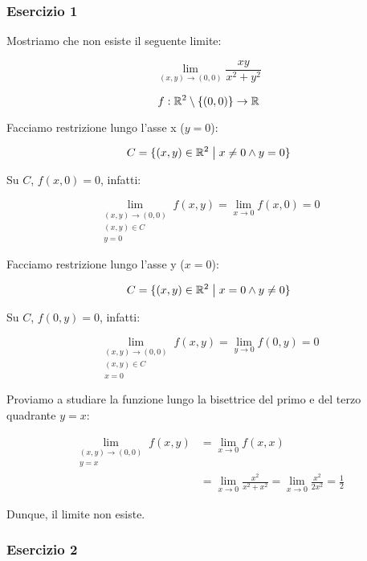 \filbreak{}
\subsubsection*{Esercizio 1}

Mostriamo che non esiste il seguente limite:

\[
    \lim_{ (x,y) \to (0,0) } \frac{xy}{x^{2}+y^{2}}
\]

\[
    f: \mathbb{R}^2 \setminus \{(0,0)\} \to \mathbb{R}
\]

Facciamo restrizione lungo l'asse x (\(y=0\)):

\[
    C = \{(x,y) \in \mathbb{R}^2 \;\big|\; x \neq 0 \land y = 0\}
\]

Su \(C\), \(f(x,0) = 0\), infatti:

\[
    \lim_{\begin{smallmatrix} (x,y) \to (0,0) \\ (x,y) \in C \\ y=0 \end{smallmatrix}} f(x,y) = \lim_{x \to 0} f(x, 0) = 0
\]

Facciamo restrizione lungo l'asse y (\(x=0\)):

\[
    C = \{(x,y) \in \mathbb{R}^2 \;\big|\; x = 0 \land y \neq 0\}
\]

Su \(C\), \(f(0, y) = 0\), infatti:

\[
    \lim_{\begin{smallmatrix} (x,y) \to (0,0) \\ (x,y) \in C \\ x=0 \end{smallmatrix}} f(x,y) = \lim_{y \to 0} f(0, y)  = 0
\]

Proviamo a studiare la funzione lungo la bisettrice del primo e del terzo quadrante \(y=x\):

\begin{align*}
    \lim_{\begin{smallmatrix} (x,y) \to (0,0) \\ y=x \end{smallmatrix}} f(x,y) & = \lim_{ x \to 0 } f(x,x)                    \\
                                                                               & = \lim_{ x \to 0 } \frac{x^{2}}{x^{2}+x^{2}}
    = \lim_{ x \to 0 } \frac{x^{2}}{2x^{2}}
    = \frac{1}{2}
\end{align*}

Dunque, il limite non esiste.

\filbreak{}
\subsubsection*{Esercizio 2}

